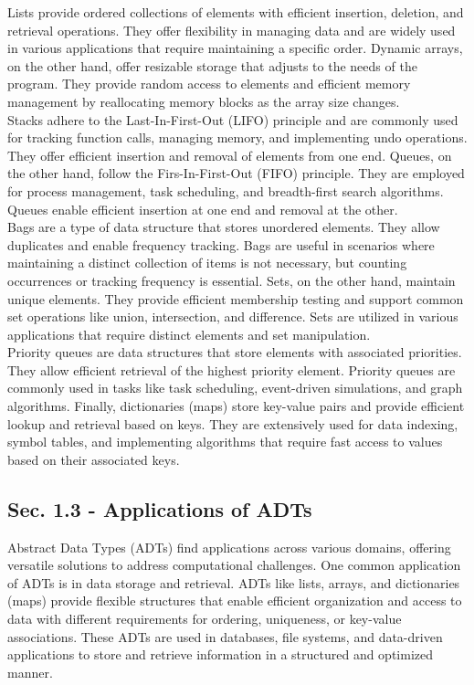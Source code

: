 Lists provide ordered collections of elements with efficient insertion, deletion, and retrieval operations. They offer flexibility in managing data and are widely used in various applications that
require maintaining a specific order. Dynamic arrays, on the other hand, offer resizable storage that adjusts to the needs of the program. They provide random access to elements and efficient memory management
by reallocating memory blocks as the array size changes. \\

\noindent Stacks adhere to the Last-In-First-Out (LIFO) principle and are commonly used for tracking function calls, managing memory, and implementing undo operations. They offer efficient insertion and removal
of elements from one end. Queues, on the other hand, follow the Firs-In-First-Out (FIFO) principle. They are employed for process management, task scheduling, and breadth-first search algorithms. Queues enable
efficient insertion at one end and removal at the other. \\

\noindent Bags are a type of data structure that stores unordered elements. They allow duplicates and enable frequency tracking. Bags are useful in scenarios where maintaining a distinct collection of items is not
necessary, but counting occurrences or tracking frequency is essential. Sets, on the other hand, maintain unique elements. They provide efficient membership testing and support common set operations like union,
intersection, and difference. Sets are utilized in various applications that require distinct elements and set manipulation. \\

\noindent Priority queues are data structures that store elements with associated priorities. They allow efficient retrieval of the highest priority element. Priority queues are commonly used in tasks like task
scheduling, event-driven simulations, and graph algorithms. Finally, dictionaries (maps) store key-value pairs and provide efficient lookup and retrieval based on keys. They are extensively used for data indexing,
symbol tables, and implementing algorithms that require fast access to values based on their associated keys. \\

\subsection*{Sec. 1.3 - Applications of ADTs}
Abstract Data Types (ADTs) find applications across various domains, offering versatile solutions to address computational challenges. One common application of ADTs is in data storage and retrieval. ADTs like lists,
arrays, and dictionaries (maps) provide flexible structures that enable efficient organization and access to data with different requirements for ordering, uniqueness, or key-value associations. These ADTs are used in
databases, file systems, and data-driven applications to store and retrieve information in a structured and optimized manner. \\

